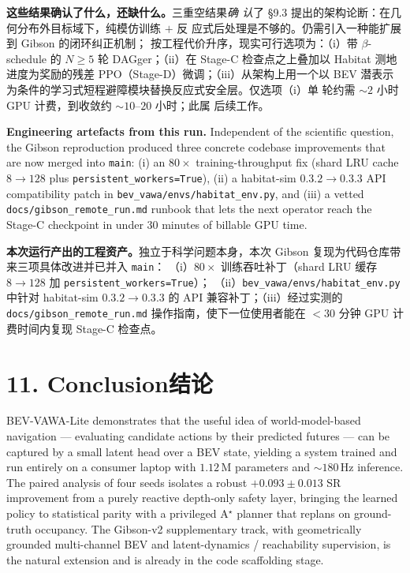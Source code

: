 \documentclass[11pt,a4paper]{article}
\newcommand{\en}[1]{\par\noindent #1\par\vspace{0.15em}}
\newcommand{\zh}[1]{\par\noindent\color{zhcol}\hspace{0.5em}#1\par\color{black}\vspace{0.6em}}
\newcommand{\bisec}[2]{\section[#1]{#1\quad\normalfont\small\color{zhcol}\textsf{#2}}}
\begin{document}
\zh{\textsf{\textbf{这些结果确认了什么，还缺什么。}三重空结果\emph{确
认}了 \S9.3 提出的架构论断：在几何分布外目标域下，纯模仿训练 $+$ 反
应式后处理是不够的。仍需引入一种能扩展到 Gibson 的闭环纠正机制；
按工程代价升序，现实可行选项为：（i）带 $\beta$-schedule 的 $N
\ge 5$ 轮 DAGger；（ii）在 Stage-C 检查点之上叠加以 Habitat 测地
进度为奖励的残差 PPO（Stage-D）微调；（iii）从架构上用一个以 BEV
潜表示为条件的学习式短程避障模块替换反应式安全层。仅选项（i）单
轮约需 $\sim 2$ 小时 GPU 计费，到收敛约 $\sim 10$–$20$ 小时；此属
后续工作。}}

\en{\textbf{Engineering artefacts from this run.} Independent of the
scientific question, the Gibson reproduction produced three concrete
codebase improvements that are now merged into \texttt{main}: (i) an
$80\times$ training-throughput fix (shard LRU cache $8 \to 128$ plus
\texttt{persistent\_workers=True}), (ii) a habitat-sim
$0.3.2 \to 0.3.3$ API compatibility patch in
\texttt{bev\_vawa/envs/habitat\_env.py}, and (iii) a vetted
\texttt{docs/gibson\_remote\_run.md} runbook that lets the next operator
reach the Stage-C checkpoint in under $30$ minutes of billable GPU time.}

\zh{\textsf{\textbf{本次运行产出的工程资产。}独立于科学问题本身，本次
Gibson 复现为代码仓库带来三项具体改进并已并入 \texttt{main}：
（i）$80\times$ 训练吞吐补丁（shard LRU 缓存 $8\to 128$ 加
\texttt{persistent\_workers=True}）；
（ii）\texttt{bev\_vawa/envs/habitat\_env.py} 中针对 habitat-sim
$0.3.2\to 0.3.3$ 的 API 兼容补丁；（iii）经过实测的
\texttt{docs/gibson\_remote\_run.md} 操作指南，使下一位使用者能在
$<30$ 分钟 GPU 计费时间内复现 Stage-C 检查点。}}

\bisec{11. Conclusion}{结论}

\en{BEV-VAWA-Lite demonstrates that the useful idea of world-model-based
navigation — evaluating candidate actions by their predicted futures —
can be captured by a small latent head over a BEV state, yielding a system
trained and run entirely on a consumer laptop with $1.12\,$M parameters
and $\sim 180\,$Hz inference. The paired analysis of four seeds isolates
a robust $+0.093 \pm 0.013$ SR improvement from a purely reactive depth-only
safety layer, bringing the learned policy to statistical parity with a
privileged A$^\star$ planner that replans on ground-truth occupancy. The
Gibson-v2 supplementary track, with geometrically grounded multi-channel
BEV and latent-dynamics / reachability supervision, is the natural
extension and is already in the code scaffolding stage.}
\end{document}
